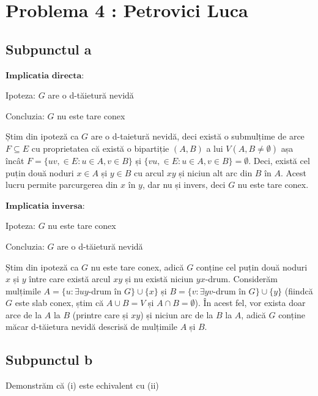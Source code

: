 \documentclass{article}
\begin{document}
{{\section*{\fontsize{20}{50}\selectfont Problema 4 : Petrovici Luca}
\subsection*{\fontsize{16}{30}\selectfont Subpunctul a}
{\fontsize{14}{16}\selectfont
$\mathbf{Implicatia}$ $\mathbf{directa:}$
\\
\par Ipoteza: $G$ are o d-tăietură nevidă
\par Concluzia: $G$ nu este tare conex
\\
\par Știm din ipoteză ca $G$ are o d-taietură nevidă, deci există o submulțime de arce $F \subseteq E$ cu proprietatea că există o bipartiție $(A, B)$ a lui $V (A, B \neq \emptyset)$ așa încât $F = \lbrace uv, \in E : u \in A, v \in B\rbrace$ și $\lbrace vu, \in E : u \in A, v \in B \rbrace = \emptyset$. Deci, există cel puțin două noduri $x \in A$ și $y \in B$ cu arcul $xy$ și niciun alt arc din $B$ în $A$. Acest lucru permite parcurgerea din $x$ în $y$, dar nu și invers, deci $G$ nu este tare conex.
\\
\par $\mathbf{Implicatia}$ $\mathbf{inversa:}$
\\
\par Ipoteza: $G$ nu este tare conex
\par Concluzia: $G$ are o d-tăietură nevidă
\\
\par Știm din ipoteză ca $G$ nu este tare conex, adică $G$ conține cel puțin două noduri $x$ și $y$ între care există arcul $xy$ și nu există niciun $yx$-drum. Considerăm mulțimile $A = \lbrace u : \exists uy$-drum în $ G\rbrace \cup \lbrace x \rbrace$ și $B = \lbrace v : \exists yv$-drum în $ G\rbrace \cup \lbrace y \rbrace$ (fiindcă $G$ este slab conex, știm că $A \cup B = V$ și $A \cap B = \emptyset$). În acest fel, vor exista doar arce de la $A$ la $B$ (printre care și $xy$) și niciun arc de la $B$ la $A$, adică $G$ conține măcar d-tăietura nevidă descrisă de mulțimile $A$ și $B$.

\subsection*{\fontsize{16}{30}\selectfont Subpunctul b}
Demonstrăm că (i) este echivalent cu (ii)

}}}
\end{document}
